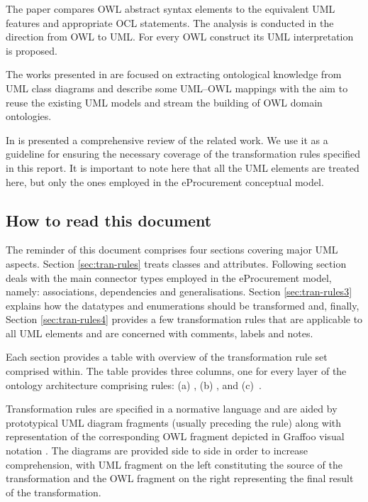 	 The paper \citep{kiko2008} compares OWL abstract syntax elements to the equivalent UML features
and appropriate OCL statements. The analysis
	 is conducted in the direction from OWL to UML.
For every OWL construct its UML interpretation
is proposed.
	 
	 The works presented in \citep{xu2012,xu2009semantics,na2006method} are focused
on extracting ontological knowledge from UML
class diagrams and describe some UML--OWL
mappings with the aim to reuse the existing
UML models and stream the building of OWL
domain ontologies.
	 
	 In \citep{sadowska2019} is presented a comprehensive review of the related work. We use it as a guideline for ensuring the necessary coverage of the transformation rules specified in this report. It is important to note here that all the UML elements are treated here, but only the ones employed in the eProcurement conceptual model. 
	
	\subsection{How to read this document}
	The reminder of this document comprises four sections covering major UML aspects. Section \ref{sec:tran-rules} treats classes and attributes. Following section deals with the main connector types employed in the eProcurement model, namely: associations, dependencies and generalisations. Section \ref{sec:tran-rules3} explains how the datatypes and enumerations should be transformed and, finally, Section \ref{sec:tran-rules4} provides a few transformation rules that are applicable to all UML elements and are concerned with comments, labels and notes.
	
	Each section provides a table with overview of the transformation rule set comprised within. The table provides three columns, one for every layer of the ontology architecture comprising rules: (a) \coreComponent, (b) \shaclComponent, and \mbox{(c) \reasoningComponent}.

	Transformation rules are specified in a normative language and are aided by prototypical UML diagram fragments (usually preceding the rule) along with representation of the corresponding OWL fragment depicted in Graffoo visual notation \citep{graffoo-falco2014modelling}. The diagrams are provided side to side in order to increase comprehension, with UML fragment on the left constituting the source of the transformation and the OWL fragment on the right representing the final result of the transformation. 
	

